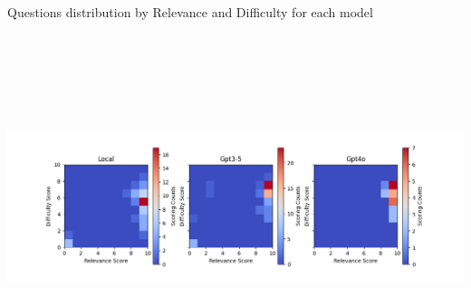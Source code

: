 {
	Questions distribution by Relevance and Difficulty for each model
    \begin{tikzfigure}
        \vspace*{-1cm}
        \hspace*{-3cm}
        \includegraphics[height=10cm]{figures/eval_plot.png}
    \end{tikzfigure}
    \vspace*{-2.5cm}
}


